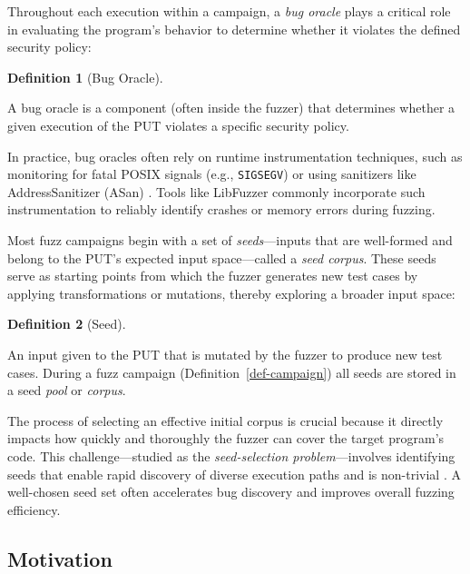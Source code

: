 \documentclass[
  a4paper,
  DIV=11,
  numbers=noendperiod]{scrreprt}
\theoremstyle{definition}
\newtheorem{definition}{Definition}[chapter]
\theoremstyle{remark}
\begin{document}
Throughout each execution within a campaign, a \emph{bug oracle} plays a
critical role in evaluating the program's behavior to determine whether
it violates the defined security policy:

\begin{definition}[Bug
Oracle]\protect\hypertarget{def-oracle}{}\label{def-oracle}

A bug oracle is a component (often inside the fuzzer) that determines
whether a given execution of the PUT violates a specific security
policy.

\end{definition}

In practice, bug oracles often rely on runtime instrumentation
techniques, such as monitoring for fatal POSIX signals (e.g.,
\texttt{SIGSEGV}) or using sanitizers like AddressSanitizer (ASan)
\autocite{serebryany2012}. Tools like LibFuzzer \autocite{libfuzzer}
commonly incorporate such instrumentation to reliably identify crashes
or memory errors during fuzzing.

Most fuzz campaigns begin with a set of \emph{seeds}---inputs that are
well-formed and belong to the PUT's expected input space---called a
\emph{seed corpus}. These seeds serve as starting points from which the
fuzzer generates new test cases by applying transformations or
mutations, thereby exploring a broader input space:

\begin{definition}[Seed]\protect\hypertarget{def-seed}{}\label{def-seed}

An input given to the PUT that is mutated by the fuzzer to produce new
test cases. During a fuzz campaign (Definition~\ref{def-campaign}) all
seeds are stored in a seed \emph{pool} or \emph{corpus}.

\end{definition}

The process of selecting an effective initial corpus is crucial because
it directly impacts how quickly and thoroughly the fuzzer can cover the
target program's code. This challenge---studied as the
\emph{seed-selection problem}---involves identifying seeds that enable
rapid discovery of diverse execution paths and is non-trivial
\autocite{rebert2014}. A well-chosen seed set often accelerates bug
discovery and improves overall fuzzing efficiency.

\subsection{Motivation}\label{motivation-1}
\end{document}
